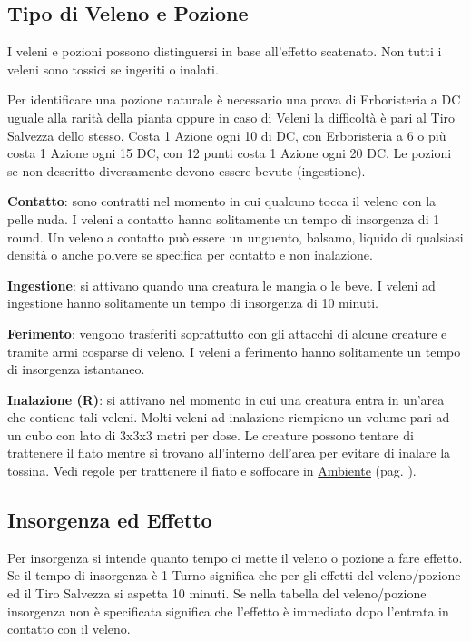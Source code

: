 \begin{multicols}{2}

\subsection{Tipo di Veleno e Pozione}\label{tipidiveleno}

I veleni e pozioni possono distinguersi in base all'effetto scatenato.
Non tutti i veleni sono tossici se ingeriti o inalati.

Per identificare una pozione naturale è necessario una prova di Erboristeria a DC uguale alla rarità della pianta oppure in caso di Veleni la difficoltà è pari al Tiro Salvezza dello stesso. Costa 1 Azione ogni 10 di DC, con Erboristeria a 6 o più costa 1 Azione ogni 15 DC, con 12 punti costa 1 Azione ogni 20 DC. Le pozioni se non descritto diversamente devono essere bevute (ingestione).

\textbf{Contatto}: sono contratti nel momento in cui qualcuno tocca il veleno con la pelle nuda. I veleni a contatto hanno solitamente un tempo di insorgenza di 1 round. Un veleno a contatto può essere un unguento, balsamo, liquido di qualsiasi densità o anche polvere se specifica per contatto e non inalazione.

\textbf{Ingestione}: si attivano quando una creatura le mangia o le beve. I veleni ad ingestione hanno solitamente un tempo di insorgenza di 10 minuti.

\textbf{Ferimento}: vengono trasferiti soprattutto con gli attacchi di alcune creature e tramite armi cosparse di veleno. I veleni a ferimento hanno solitamente un tempo di insorgenza istantaneo.

\textbf{Inalazione (R)}: si attivano nel momento in cui una creatura entra in un'area che contiene tali veleni. Molti veleni ad inalazione riempiono un volume pari ad un cubo con lato di 3x3x3 metri per dose. Le creature possono tentare di trattenere il fiato mentre si trovano all'interno dell'area per evitare di inalare la tossina.
Vedi regole per trattenere il fiato e soffocare in \hyperlink{trattenereilfiato}{Ambiente} (pag. \pageref{trattenereilfiato}).

\subsection{Insorgenza ed Effetto}\label{insorgenzaveleno}\hypertarget{insorgenzaveleno}{}

Per insorgenza si intende quanto tempo ci mette il veleno o pozione a fare effetto. Se il tempo di insorgenza è 1 Turno significa che per gli effetti del veleno/pozione ed il Tiro Salvezza si aspetta 10 minuti. Se nella tabella del veleno/pozione insorgenza non è specificata significa che l'effetto è immediato dopo l'entrata in contatto con il veleno.


\end{multicols}
